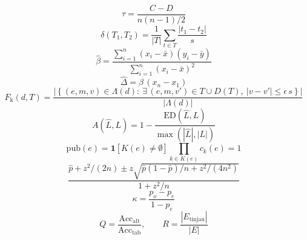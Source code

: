 \documentclass{article}
\begin{document}
\begin{equation}
\tau=\frac{C-D}{n(n-1)/2}
\end{equation}
\begin{equation}
\delta(T_1,T_2)=\frac{1}{|T|}\sum_{t\in T}\frac{|t_1-t_2|}{s}
\end{equation}
\begin{equation}
\hat{\beta}=\frac{\sum_{i=1}^{n}(x_i-\bar{x})(y_i-\bar{y})}{\sum_{i=1}^{n}(x_i-\bar{x})^2}
\end{equation}
\begin{equation}
\hat{\Delta}=\hat{\beta}\,(x_n-x_1)
\end{equation}
\begin{equation}
F_{\mathrm{k}}(d,T)=\frac{\left|\left\{(e,m,v)\in\Lambda(d):\ \exists\,(e,m,v')\in T\cup D(T),\ |v-v'|\le\epsilon\,s\right\}\right|}{|\Lambda(d)|}
\end{equation}
\begin{equation}
A(\hat{L},L)=1-\frac{\mathrm{ED}(\hat{L},L)}{\max(|\hat{L}|,|L|)}
\end{equation}
\begin{equation}
\mathrm{pub}(e)=\mathbf{1}\left[K(e)\neq\emptyset\right]\prod_{k\in K(e)}c_k(e)=1
\end{equation}
\begin{equation}
\frac{\hat{p}+z^2/(2n)\pm z\sqrt{\hat{p}(1-\hat{p})/n+z^2/(4n^2)}}{1+z^2/n}
\end{equation}
\begin{equation}
\kappa=\frac{p_o-p_e}{1-p_e}
\end{equation}
\begin{equation}
Q=\frac{\mathrm{Acc}_{\mathrm{alt}}}{\mathrm{Acc}_{\mathrm{tab}}},\qquad R=\frac{|E_{\mathrm{tinjau}}|}{|E|}
\end{equation}
\end{document}
